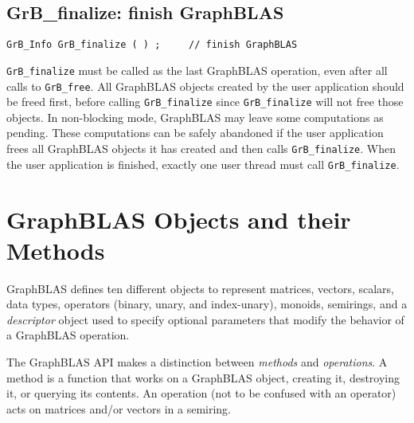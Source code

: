 \documentclass[12pt]{article}
\begin{document}
{\newpage
\subsection{{\sf GrB\_finalize:} finish GraphBLAS} %
\label{finalize}

\begin{mdframed}[userdefinedwidth=6in]
{\footnotesize
\begin{verbatim}
GrB_Info GrB_finalize ( ) ;     // finish GraphBLAS
\end{verbatim}
}\end{mdframed}

\verb'GrB_finalize' must be called as the last GraphBLAS operation, even after
all calls to \verb'GrB_free'.  All GraphBLAS objects created by the user
application should be freed first, before calling \verb'GrB_finalize' since
\verb'GrB_finalize' will not free those objects.  In non-blocking mode,
GraphBLAS may leave some computations as pending.  These computations can be
safely abandoned if the user application frees all GraphBLAS objects it has
created and then calls \verb'GrB_finalize'.  When the user application is
finished, exactly one user thread must call \verb'GrB_finalize'.

\newpage
\section{GraphBLAS Objects and their Methods} %
\label{objects}

GraphBLAS defines ten different objects to represent matrices, vectors,
scalars, data types, operators (binary, unary, and index-unary), monoids,
semirings, and a {\em descriptor} object used to specify optional parameters
that modify the behavior of a GraphBLAS operation.

The GraphBLAS API makes a distinction between {\em methods} and {\em
operations}.  A method is a function that works on a GraphBLAS object, creating
it, destroying it, or querying its contents.  An operation (not to be confused
with an operator) acts on matrices and/or vectors in a semiring.

}
\end{document}
